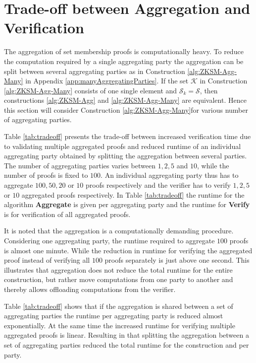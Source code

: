 \section{Trade-off between Aggregation and Verification}
\label{sec:tradeoff}
The aggregation of set membership proofs is computationally heavy. To reduce the computation required by a single aggregating party the aggregation can be split between several aggregating parties as in Construction \ref{alg:ZKSM-Agg-Many} in Appendix \ref{app:manyAggregatingParties}. If the set $\mathcal{K}$ in Construction \ref{alg:ZKSM-Agg-Many} consists of one single element and $\mathcal{S}_k=\mathcal{S}$, then constructions \ref{alg:ZKSM-Agg} and \ref{alg:ZKSM-Agg-Many} are equivalent. Hence this section will consider Construction \ref{alg:ZKSM-Agg-Many}for various number of aggregating parties.

Table \ref{tab:tradeoff} presents the trade-off between increased verification time due to  validating multiple aggregated proofs and reduced runtime of  an individual aggregating party obtained by splitting the aggregation between  several parties. The number of aggregating parties varies between $1,2,5$ and $10$, while the number of proofs is fixed to $100$. An individual aggregating party thus has to aggregate $100,50,20$ or $10$  proofs respectively and the verifier has to verify $1,2,5$ or $10$ aggregated proofs respectively. In Table \ref{tab:tradeoff} the runtime for the algorithm \textbf{Aggregate} is given per aggregating party and the runtime for \textbf{Verify} is for verification of all aggregated proofs. 

It is noted that the aggregation is a computationally demanding procedure. Considering one aggregating party, the runtime required to aggregate $100$ proofs is almost one minute. While the reduction in runtime for verifying the aggregated proof instead of verifying all $100$ proofs separately is just above one second. This illustrates that aggregation does not reduce the total runtime for the entire construction, but rather move computations from one party to another and thereby allows offloading computations from the verifier.

Table \ref{tab:tradeoff} shows that if the aggregation is shared between a set of aggregating parties the runtime per aggregating party is reduced almost exponentially. At the same time the increased runtime for verifying multiple aggregated proofs is linear. Resulting in that splitting the aggregation between a set of aggregating parties reduced the total runtime for the construction and per party.



